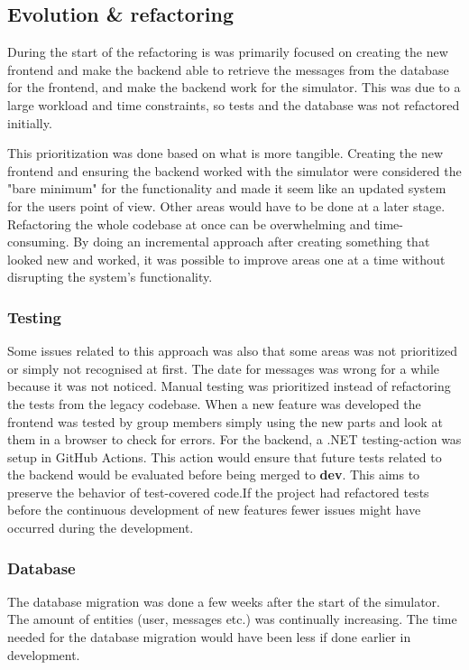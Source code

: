 \subsection{Evolution \& refactoring}

During the start of the refactoring is was primarily focused on creating the new frontend and make the backend able to retrieve the messages from the database for the frontend, and make the backend work for the simulator. This was due to a large workload and time constraints, so tests and the database was not refactored initially.

This prioritization was done based on what is more tangible. Creating the new frontend and ensuring the backend worked with the simulator were considered the "bare minimum" for the functionality and made it seem like an updated system for the users point of view. Other areas would have to be done at a later stage.
Refactoring the whole codebase at once can be overwhelming and time-consuming. By doing an incremental approach after creating something that looked new and worked, it was possible to improve areas one at a time without disrupting the system's functionality.

\subsubsection{Testing}
Some issues related to this approach was also that some areas was not prioritized or simply not recognised at first. The date for messages was wrong for a while because it was not noticed.
Manual testing was prioritized instead of refactoring the tests from the legacy codebase. When a new feature was developed the frontend was tested by group members simply using the new parts and look at them in a browser to check for errors. For the backend, a .NET testing-action was setup in GitHub Actions. This action would ensure that future tests related to the backend would be evaluated before being merged to \textbf{dev}. This aims to preserve the behavior of test-covered code.\newline If the project had refactored tests before the continuous development of new features fewer issues might have occurred during the development.

\subsubsection{Database}
The database migration was done a few weeks after the start of the simulator. The amount of entities (user, messages etc.) was continually increasing. The time needed for the database migration would have been less if done earlier in development. 
